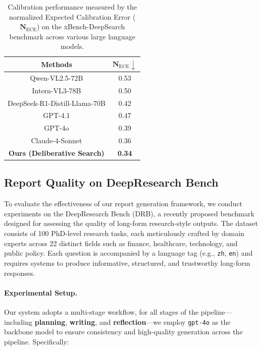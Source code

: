 \documentclass[11pt]{article}
\begin{document}
\begin{table}[ht]
    \small
    \centering
    \begin{tabular}{c|c}
        \toprule[1pt]\midrule
        \textbf{Methods} & $\mathbf{N}_{\mathrm{ECE}} \downarrow$ \\
        \midrule
        Qwen-VL2.5-72B                 & 0.53 \\
        Intern-VL3-78B                  & 0.50 \\
        DeepSeek-R1-Distill-Llama-70B & 0.42 \\
        GPT-4.1                       & 0.47 \\
        GPT-4o                        & 0.39 \\
        Claude-4-Sonnet              & 0.36 \\
        \rowcolor[gray]{.9}
        \textbf{Ours (Deliberative Search)} & \textbf{0.34} \\
        \midrule\bottomrule[1pt]
    \end{tabular}
    \caption{Calibration performance measured by the normalized Expected Calibration Error ($\mathbf{N}_{\mathrm{ECE}}$) on the xBench-DeepSearch benchmark across various large language models.}
    \label{tab:xbench_results}
\end{table}


\subsection{Report Quality on DeepResearch Bench}
To evaluate the effectiveness of our report generation framework, we conduct experiments on the DeepResearch Bench (DRB)\cite{du2025deepresearch}, a recently proposed benchmark designed for assessing the quality of long-form research-style outputs. The dataset consists of 100 PhD-level research tasks, each meticulously crafted by domain experts across 22 distinct fields such as finance, healthcare, technology, and public policy. Each question is accompanied by a language tag (e.g., \texttt{zh}, \texttt{en}) and requires systems to produce informative, structured, and trustworthy long-form responses.

\paragraph{Experimental Setup.}
Our system adopts a multi-stage workflow, for all stages of the pipeline—including \textbf{planning}, \textbf{writing}, and \textbf{reflection}—we employ \texttt{gpt-4o} as the backbone model to ensure consistency and high-quality generation across the pipeline. Specifically:
\end{document}
